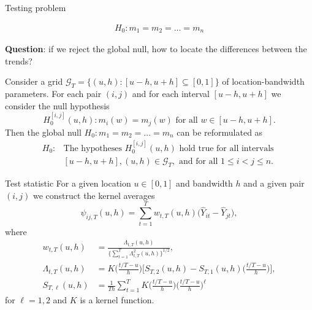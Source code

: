\documentclass[10pt]{beamer}
\begin{document}
\begin{frame}{Testing problem}

\begin{align*}
H_0: m_1 = m_2 = \ldots = m_n
\end{align*}\pause

\vspace{-4mm}
\textbf{Question}: if we reject the global null, how to locate the differences between the trends? \pause

Consider a grid $\mathcal{G}_T = \{(u, h): [u-h, u+h] \subseteq [0, 1]\}$ of location-bandwidth parameters. \pause For each pair $(i, j)$ and for each interval $[u-h, u+h]$ we consider the null hypothesis 
\[ H_0^{[i,j]}(u,h): m_i(w) = m_j(w) \text{ for all } w \in [u-h,u+h]. \]\pause
Then the global null $H_0: m_1 = m_2 = \ldots = m_n$ can be reformulated as
\begin{align*}
H_0:  &\text{The hypotheses } H_0^{[i,j]}(u,h) \text{ hold true for all intervals } \\ &[u- h , u+h], (u, h) \in \mathcal{G}_T, \text{ and for all } 1 \le i < j \le n. 
\end{align*} 
\end{frame}


\begin{frame}{Test statistic}
For a given location $u \in [0,1]$ and bandwidth $h$ and a given pair $(i, j)$ we construct the kernel averages
\begin{equation*}
\widehat{\psi}_{ij, T}(u,h) = \sum\limits_{t=1}^T w_{t,T}(u,h) \big(\widehat{Y}_{it} - \widehat{Y}_{jt}), 
\end{equation*}\pause
\vspace{-3mm}
where 
\begin{align*}
w_{t,T}(u,h) &= \frac{\Lambda_{t,T}(u,h)}{ \{\sum\nolimits_{t=1}^T \Lambda_{t,T}^2(u,h)\}^{1/2} } ,\\
\Lambda_{t,T}(u,h) &= K\Big(\frac{t/T-u}{h}\Big) \Big[ S_{T,2}(u,h)  - S_{T,1}(u,h)\Big(\frac{t/T-u}{h}\Big) \Big], \\
S_{T,\ell}(u,h) &= \frac{1}{Th} \sum\nolimits_{t=1}^T K\Big(\frac{t/T-u}{h}\Big) \Big(\frac{t/T-u}{h}\Big)^\ell
\end{align*}
for $\ell = 1,2$ and $K$ is a kernel function.
\end{frame}
\end{document}
